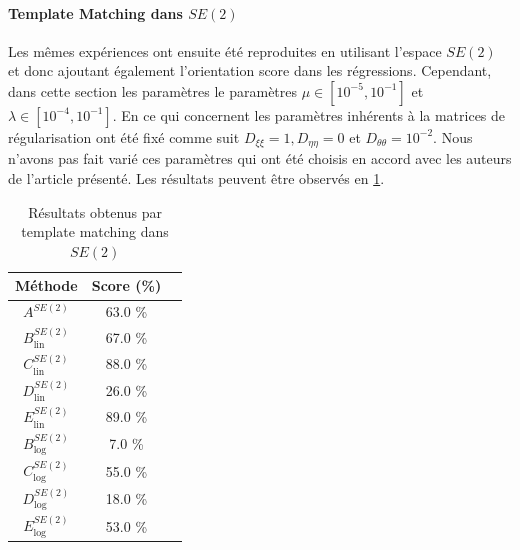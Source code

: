 \documentclass{article}
\begin{document}
\paragraph{Template Matching dans $SE(2)$}
Les mêmes expériences ont ensuite été reproduites en utilisant l'espace $SE(2)$ et donc ajoutant également l'orientation score dans les régressions.
Cependant, dans cette section les paramètres le paramètres $\mu \in [10^{-5}, 10^{-1}]$ et $\lambda \in [10^{-4}, 10^{-1}]$. En ce qui concernent les paramètres inhérents à la matrices de 
régularisation ont été fixé comme suit $D_{\xi \xi}=1, D_{\eta \eta} = 0$ et $D_{\theta \theta} = 10^{-2}$. Nous n'avons pas fait varié ces paramètres qui ont été choisis en accord avec les auteurs 
de l'article présenté. Les résultats peuvent être observés en \ref{table: SE(2)}.

\begin{table}[h!]
    \centering
    \begin{tabular}{|c|c|c|}
        \hline
        Méthode & Score (\%)\\
        \hline
        \hline
        $A^{SE(2)}$&  63.0 \% \\
        \hline
        $B_{\text{lin}}^{SE(2)}$&  67.0    \%   \\
        $C_{\text{lin}}^{SE(2)}$&  88.0    \%   \\
        $D_{\text{lin}}^{SE(2)}$&  26.0   \%   \\
        $E_{\text{lin}}^{SE(2)}$&  89.0    \%   \\
        \hline
        $B_{\text{log}}^{SE(2)} $&  7.0  \%   \\ 
        $C_{\text{log}}^{SE(2)} $&  55.0  \%   \\ 
        $D_{\text{log}}^{SE(2)} $&  18.0 \%   \\ 
        $E_{\text{log}}^{SE(2)} $&  53.0  \%   \\ 
        \hline
    \end{tabular}
    \caption{Résultats obtenus par template matching dans $SE(2)$}
    \label{table: SE(2)}
\end{table}
\end{document}

